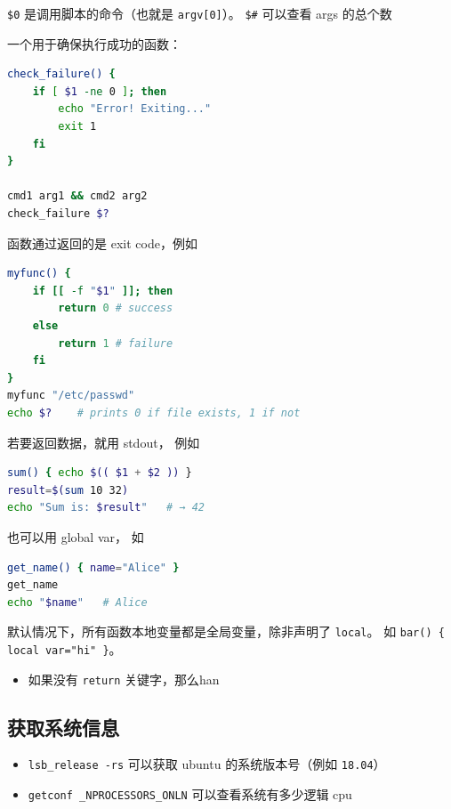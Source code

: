 \verb`$0` 是调用脚本的命令（也就是 \verb`argv[0]`）。 \verb`$#` 可以查看 args 的总个数

一个用于确保执行成功的函数：
\begin{lstlisting}[language=bash]
check_failure() {
    if [ $1 -ne 0 ]; then
        echo "Error! Exiting..."
        exit 1
    fi
}

cmd1 arg1 && cmd2 arg2
check_failure $?
\end{lstlisting}

函数通过返回的是 exit code，例如
\begin{lstlisting}[language=bash]
myfunc() {
    if [[ -f "$1" ]]; then
        return 0 # success
    else
        return 1 # failure
    fi
}
myfunc "/etc/passwd"
echo $?    # prints 0 if file exists, 1 if not
\end{lstlisting}

若要返回数据，就用 stdout， 例如
\begin{lstlisting}[language=bash]
sum() { echo $(( $1 + $2 )) }
result=$(sum 10 32)
echo "Sum is: $result"   # → 42
\end{lstlisting}

也可以用 global var， 如
\begin{lstlisting}[language=bash]
get_name() { name="Alice" }
get_name
echo "$name"   # Alice
\end{lstlisting}

默认情况下，所有函数本地变量都是全局变量，除非声明了 \verb`local`。 如 \verb`bar() { local var="hi" }`。

\begin{itemize}
\item 如果没有 \verb`return` 关键字，那么han
\end{itemize}


\subsection{获取系统信息}
\begin{itemize}
\item \verb`lsb_release -rs` 可以获取 ubuntu 的系统版本号（例如 \verb`18.04`）
\item \verb`getconf _NPROCESSORS_ONLN` 可以查看系统有多少逻辑 cpu
\end{itemize}
